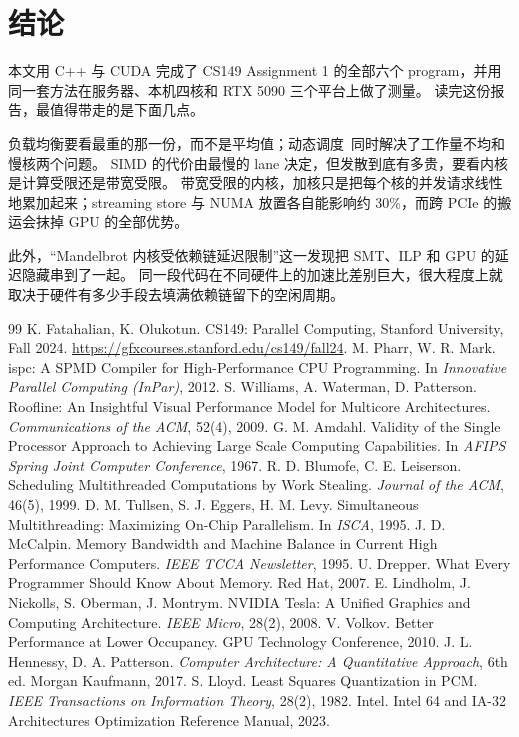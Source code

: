 \documentclass[11pt,a4paper]{ctexart}
\begin{document}
\section{结论}

本文用 C++ 与 CUDA 完成了 CS149 Assignment 1 的全部六个 program，并用同一套方法在服务器、本机四核和 RTX 5090 三个平台上做了测量。
读完这份报告，最值得带走的是下面几点。

负载均衡要看最重的那一份，而不是平均值；动态调度~\cite{cilk}同时解决了工作量不均和慢核两个问题。
SIMD 的代价由最慢的 lane 决定，但发散到底有多贵，要看内核是计算受限还是带宽受限。
带宽受限的内核，加核只是把每个核的并发请求线性地累加起来；streaming store 与 NUMA 放置各自能影响约 30\%，而跨 PCIe 的搬运会抹掉 GPU 的全部优势。

此外，``Mandelbrot 内核受依赖链延迟限制''这一发现把 SMT、ILP 和 GPU 的延迟隐藏串到了一起。
同一段代码在不同硬件上的加速比差别巨大，很大程度上就取决于硬件有多少手段去填满依赖链留下的空闲周期。

\begin{thebibliography}{99}
 K. Fatahalian, K. Olukotun. CS149: Parallel Computing, Stanford University, Fall 2024. \url{https://gfxcourses.stanford.edu/cs149/fall24}.
 M. Pharr, W. R. Mark. ispc: A SPMD Compiler for High-Performance CPU Programming. In \emph{Innovative Parallel Computing (InPar)}, 2012.
 S. Williams, A. Waterman, D. Patterson. Roofline: An Insightful Visual Performance Model for Multicore Architectures. \emph{Communications of the ACM}, 52(4), 2009.
 G. M. Amdahl. Validity of the Single Processor Approach to Achieving Large Scale Computing Capabilities. In \emph{AFIPS Spring Joint Computer Conference}, 1967.
 R. D. Blumofe, C. E. Leiserson. Scheduling Multithreaded Computations by Work Stealing. \emph{Journal of the ACM}, 46(5), 1999.
 D. M. Tullsen, S. J. Eggers, H. M. Levy. Simultaneous Multithreading: Maximizing On-Chip Parallelism. In \emph{ISCA}, 1995.
 J. D. McCalpin. Memory Bandwidth and Machine Balance in Current High Performance Computers. \emph{IEEE TCCA Newsletter}, 1995.
 U. Drepper. What Every Programmer Should Know About Memory. Red Hat, 2007.
 E. Lindholm, J. Nickolls, S. Oberman, J. Montrym. NVIDIA Tesla: A Unified Graphics and Computing Architecture. \emph{IEEE Micro}, 28(2), 2008.
 V. Volkov. Better Performance at Lower Occupancy. GPU Technology Conference, 2010.
 J. L. Hennessy, D. A. Patterson. \emph{Computer Architecture: A Quantitative Approach}, 6th ed. Morgan Kaufmann, 2017.
 S. Lloyd. Least Squares Quantization in PCM. \emph{IEEE Transactions on Information Theory}, 28(2), 1982.
 Intel. Intel 64 and IA-32 Architectures Optimization Reference Manual, 2023.
\end{thebibliography}
\end{document}
